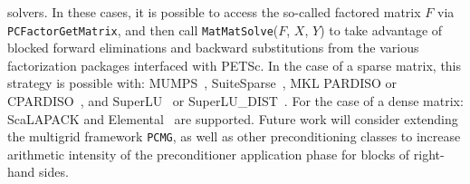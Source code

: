 \documentclass[3p,11pt]{elsarticle}
\newcommand{\pk}[1]{\texttt{#1}}
\begin{document}
solvers.  In these cases, it is possible to access the so-called factored
matrix $F$
via \pk{PCFactorGetMatrix}, and then call \pk{MatMatSolve}($F$, $X$, $Y$) to
take advantage of blocked forward eliminations and backward substitutions from
the various factorization packages interfaced with PETSc. In the case of a
sparse matrix, this strategy is possible with: MUMPS~\cite{amestoy2001fully},
SuiteSparse~\cite{davis2004algorithm}, MKL PARDISO or
CPARDISO~\cite{mkl-web-page}, and SuperLU~\cite{li2005overview} or
SuperLU\_DIST~\cite{li2003superlu_dist}. For the case of a dense matrix:
ScaLAPACK and Elemental~\cite{poulson2013elemental} are supported. Future work
will consider extending the multigrid framework \pk{PCMG}, as well as other
preconditioning classes to increase arithmetic intensity of the preconditioner
application phase for blocks of right-hand sides.

\end{document}
